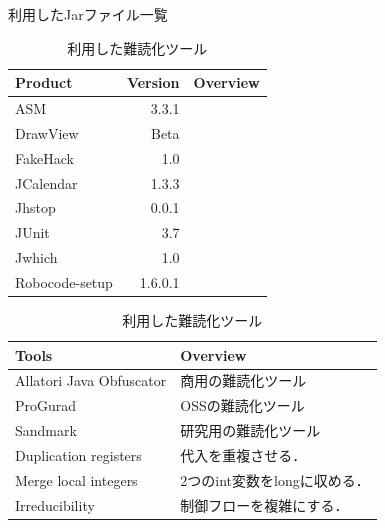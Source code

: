 \documentclass[a4j,fleqn,10pt]{jarticle}
\begin{document}
\begin{table}[t]
  \centering
  \footnotesize{
    \caption{利用したJarファイル一覧}\label{table:jars}
  \begin{tabular}{l|r|p{3.5cm}}
    Product & Version & Overview \\ \hline
    ASM       & 3.3.1 & \\
    DrawView  & Beta  & \\
    FakeHack  & 1.0   & \\
    JCalendar & 1.3.3 & \\
    Jhstop    & 0.0.1 & \\
    JUnit     & 3.7   & \\
    Jwhich    & 1.0   & \\
    Robocode-setup & 1.6.0.1 & \\
  \end{tabular}
  \caption{利用した難読化ツール}\label{table:tools}
  \begin{tabular}{l|l}
      Tools & Overview \\ \hline
      Allatori Java Obfuscator & 商用の難読化ツール \\ \hline
      ProGurad                 & OSSの難読化ツール \\ \hline
      Sandmark                 & 研究用の難読化ツール \\
      \hspace{0.2cm} Duplication registers & 代入を重複させる．\\
      \hspace{0.2cm} Merge local integers & 2つのint変数をlongに収める．\\
      \hspace{0.2cm} Irreducibility       & 制御フローを複雑にする．\\
  \end{tabular}}
\end{table}





\end{document}
